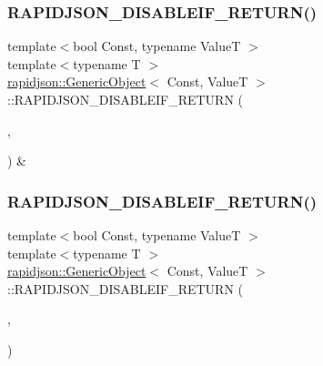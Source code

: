 \subsubsection{\texorpdfstring{RAPIDJSON\_DISABLEIF\_RETURN()}{RAPIDJSON\_DISABLEIF\_RETURN()}\hspace{0.1cm}{\footnotesize\ttfamily [1/2]}}
{\footnotesize\ttfamily template$<$bool Const, typename ValueT $>$ \\
template$<$typename T $>$ \\
\mbox{\hyperlink{classrapidjson_1_1_generic_object}{rapidjson\+::\+Generic\+Object}}$<$ Const, ValueT $>$\+::R\+A\+P\+I\+D\+J\+S\+O\+N\+\_\+\+D\+I\+S\+A\+B\+L\+E\+I\+F\+\_\+\+R\+E\+T\+U\+RN (\begin{DoxyParamCaption}\item[{(internal\+::\+Or\+Expr$<$ internal\+::\+Is\+Pointer$<$ T $>$, \mbox{\hyperlink{structrapidjson_1_1internal_1_1_is_generic_value}{internal\+::\+Is\+Generic\+Value}}$<$ T $>$ $>$)}]{,  }\item[{(\mbox{\hyperlink{classrapidjson_1_1_generic_object_a282660500748eff5ebab93b88a9d478f}{Value\+Type}} \&)}]{ }\end{DoxyParamCaption}) \&}

\mbox{\label{classrapidjson_1_1_generic_object_a37ca81cfe9b1f26856ebae811dd5d65f}} 
\subsubsection{\texorpdfstring{RAPIDJSON\_DISABLEIF\_RETURN()}{RAPIDJSON\_DISABLEIF\_RETURN()}\hspace{0.1cm}{\footnotesize\ttfamily [2/2]}}
{\footnotesize\ttfamily template$<$bool Const, typename ValueT $>$ \\
template$<$typename T $>$ \\
\mbox{\hyperlink{classrapidjson_1_1_generic_object}{rapidjson\+::\+Generic\+Object}}$<$ Const, ValueT $>$\+::R\+A\+P\+I\+D\+J\+S\+O\+N\+\_\+\+D\+I\+S\+A\+B\+L\+E\+I\+F\+\_\+\+R\+E\+T\+U\+RN (\begin{DoxyParamCaption}\item[{(internal\+::\+Or\+Expr$<$ internal\+::\+Is\+Pointer$<$ T $>$, \mbox{\hyperlink{structrapidjson_1_1internal_1_1_is_generic_value}{internal\+::\+Is\+Generic\+Value}}$<$ T $>$ $>$)}]{,  }\item[{(\mbox{\hyperlink{classrapidjson_1_1_generic_object}{Generic\+Object}}$<$ Const, ValueT $>$)}]{ }\end{DoxyParamCaption})}

